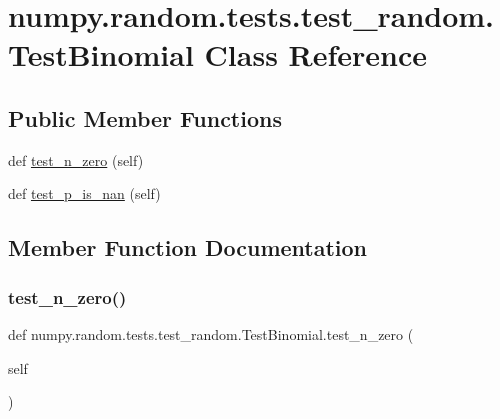 \hypertarget{classnumpy_1_1random_1_1tests_1_1test__random_1_1TestBinomial}{}\section{numpy.\+random.\+tests.\+test\+\_\+random.\+Test\+Binomial Class Reference}
\label{classnumpy_1_1random_1_1tests_1_1test__random_1_1TestBinomial}
\subsection*{Public Member Functions}
\begin{DoxyCompactItemize}
\item 
def \hyperlink{classnumpy_1_1random_1_1tests_1_1test__random_1_1TestBinomial_aec35af63323126fa7227728b7542bef4}{test\+\_\+n\+\_\+zero} (self)
\item 
def \hyperlink{classnumpy_1_1random_1_1tests_1_1test__random_1_1TestBinomial_a967748d18482fa4585def4c1119b1f87}{test\+\_\+p\+\_\+is\+\_\+nan} (self)
\end{DoxyCompactItemize}


\subsection{Member Function Documentation}
\mbox{\label{classnumpy_1_1random_1_1tests_1_1test__random_1_1TestBinomial_aec35af63323126fa7227728b7542bef4}} 
\subsubsection{\texorpdfstring{test\+\_\+n\+\_\+zero()}{test\_n\_zero()}}
{\footnotesize\ttfamily def numpy.\+random.\+tests.\+test\+\_\+random.\+Test\+Binomial.\+test\+\_\+n\+\_\+zero (\begin{DoxyParamCaption}\item[{}]{self }\end{DoxyParamCaption})}


